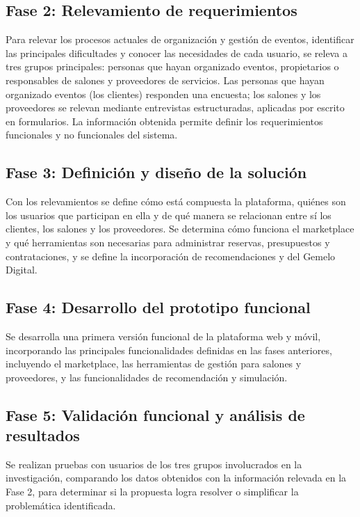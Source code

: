 \subsection{Fase 2: Relevamiento de requerimientos}

Para relevar los procesos actuales de organización y gestión de eventos,
identificar las principales dificultades y conocer las necesidades de
cada usuario, se releva a tres grupos principales: personas que hayan
organizado eventos, propietarios o responsables de salones y
proveedores de servicios. Las personas que hayan organizado eventos
(los clientes) responden una encuesta; los salones y los proveedores se
relevan mediante entrevistas estructuradas, aplicadas por escrito en
formularios. La información obtenida
permite definir los requerimientos funcionales y no funcionales del
sistema.

\subsection{Fase 3: Definición y diseño de la solución}

Con los relevamientos se define cómo está compuesta la plataforma,
quiénes son los usuarios que participan en ella y de qué manera se
relacionan entre sí los clientes, los salones y los proveedores. Se
determina cómo funciona el marketplace y qué herramientas son necesarias
para administrar reservas, presupuestos y contrataciones, y se define la
incorporación de recomendaciones y del Gemelo Digital.

\subsection{Fase 4: Desarrollo del prototipo funcional}

Se desarrolla una primera versión funcional de la plataforma web y móvil,
incorporando las principales funcionalidades definidas en las fases
anteriores, incluyendo el marketplace, las herramientas de gestión para
salones y proveedores, y las funcionalidades de
recomendación y simulación.

\subsection{Fase 5: Validación funcional y análisis de resultados}

Se realizan pruebas con usuarios de los tres grupos involucrados en la
investigación, comparando los datos obtenidos con la información relevada
en la Fase 2, para determinar si la propuesta logra resolver o simplificar
la problemática identificada.

